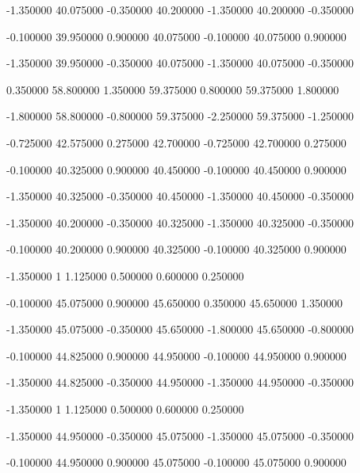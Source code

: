  {-1.350000} {40.075000} {-0.350000} {40.200000} {-1.350000} {40.200000} {-0.350000}

 {-0.100000} {39.950000} {0.900000} {40.075000} {-0.100000} {40.075000} {0.900000}

 {-1.350000} {39.950000} {-0.350000} {40.075000} {-1.350000} {40.075000} {-0.350000}

 {0.350000} {58.800000} {1.350000} {59.375000} {0.800000} {59.375000} {1.800000}

 {-1.800000} {58.800000} {-0.800000} {59.375000} {-2.250000} {59.375000} {-1.250000}

 {-0.725000} {42.575000} {0.275000} {42.700000} {-0.725000} {42.700000} {0.275000}

 {-0.100000} {40.325000} {0.900000} {40.450000} {-0.100000} {40.450000} {0.900000}

 {-1.350000} {40.325000} {-0.350000} {40.450000} {-1.350000} {40.450000} {-0.350000}

 {-1.350000} {40.200000} {-0.350000} {40.325000} {-1.350000} {40.325000} {-0.350000}

 {-0.100000} {40.200000} {0.900000} {40.325000} {-0.100000} {40.325000} {0.900000}

 {-1.350000} {1} {1.125000} {0.500000} {0.600000} {0.250000}

 {-0.100000} {45.075000} {0.900000} {45.650000} {0.350000} {45.650000} {1.350000}

 {-1.350000} {45.075000} {-0.350000} {45.650000} {-1.800000} {45.650000} {-0.800000}

 {-0.100000} {44.825000} {0.900000} {44.950000} {-0.100000} {44.950000} {0.900000}

 {-1.350000} {44.825000} {-0.350000} {44.950000} {-1.350000} {44.950000} {-0.350000}

 {-1.350000} {1} {1.125000} {0.500000} {0.600000} {0.250000}

 {-1.350000} {44.950000} {-0.350000} {45.075000} {-1.350000} {45.075000} {-0.350000}

 {-0.100000} {44.950000} {0.900000} {45.075000} {-0.100000} {45.075000} {0.900000}


